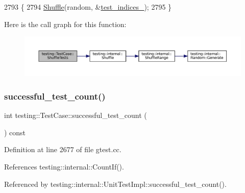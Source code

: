 \begin{DoxyCode}
2793                                                   \{
2794   \hyperlink{namespacetesting_1_1internal_a90d9e6ffe8522a7eb1b2ce9b1a0c4673}{Shuffle}(random, &\hyperlink{classtesting_1_1TestCase_a6bb04b98c46a3eecf7a4e6f62593a827}{test\_indices\_});
2795 \}
\end{DoxyCode}
Here is the call graph for this function\+:
\nopagebreak
\begin{figure}[H]
\begin{center}
\leavevmode
\includegraphics[width=350pt]{classtesting_1_1TestCase_ac26160e2aeb3d8c86b611843c5abdb29_cgraph}
\end{center}
\end{figure}
\mbox{\label{classtesting_1_1TestCase_ab61929942a202f03903182866bd0e086}} 
\subsubsection{\texorpdfstring{successful\+\_\+test\+\_\+count()}{successful\_test\_count()}}
{\footnotesize\ttfamily int testing\+::\+Test\+Case\+::successful\+\_\+test\+\_\+count (\begin{DoxyParamCaption}{ }\end{DoxyParamCaption}) const}



Definition at line 2677 of file gtest.\+cc.



References testing\+::internal\+::\+Count\+If().



Referenced by testing\+::internal\+::\+Unit\+Test\+Impl\+::successful\+\_\+test\+\_\+count().


